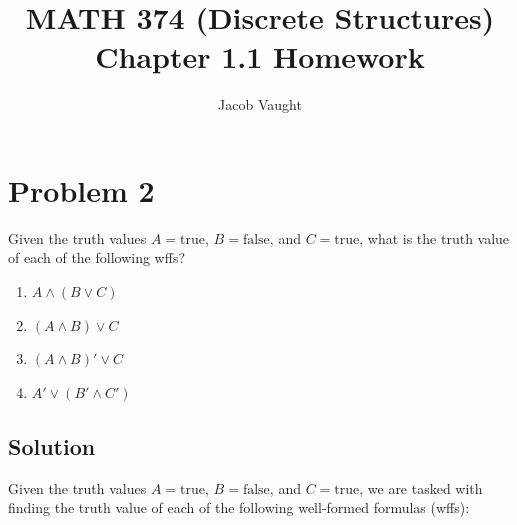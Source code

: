 \documentclass[12pt]{article}
\title{MATH 374 (Discrete Structures)\\Chapter 1.1 Homework}
\author{Jacob Vaught}
\begin{document}
\maketitle

\newpage
\section*{Problem 2}
Given the truth values \( A = \text{true} \), \( B = \text{false} \), and \( C = \text{true} \), what is the truth value of each of the following wffs?
\begin{enumerate}
    \item \( A \land (B \lor C) \)
    \item \( (A \land B) \lor C \)
    \item \( (A \land B)' \lor C \)
    \item \( A' \lor (B' \land C') \)
\end{enumerate}
\newpage
\subsection*{Solution}
Given the truth values \( A = \text{true} \), \( B = \text{false} \), and \( C = \text{true} \), we are tasked with finding the truth value of each of the following well-formed formulas (wffs):
\end{document}
